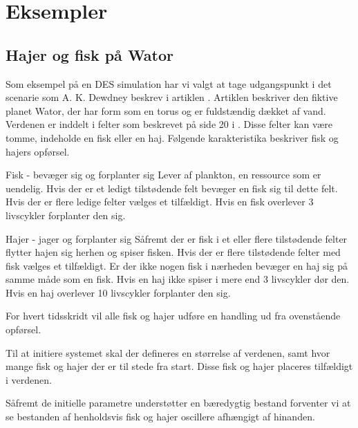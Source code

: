 \chapter{Eksempler}

\section{Hajer og fisk på Wator}
Som eksempel på en DES simulation har vi valgt at tage udgangspunkt i det scenarie som A. K. Dewdney beskrev i artiklen .
Artiklen beskriver den fiktive planet Wator, der har form som en torus og er fuldstændig dækket af vand. Verdenen er inddelt i felter som beskrevet på side 20 i . Disse felter kan være tomme, indeholde en fisk eller en haj. Følgende karakteristika beskriver fisk og hajers opførsel.


Fisk - bevæger sig og forplanter sig
Lever af plankton, en ressource som er uendelig. 
Hvis der er et ledigt tilstødende felt bevæger en fisk sig til dette felt. Hvis der er flere ledige felter vælges et tilfældigt. 
Hvis en fisk overlever 3 livscykler forplanter den sig.


Hajer - jager og forplanter sig
Såfremt der er fisk i et eller flere tilstødende felter flytter hajen sig herhen og spiser fisken. Hvis der er flere tilstødende felter med fisk vælges et tilfældigt. 
Er der ikke nogen fisk i nærheden bevæger en haj sig på samme måde som en fisk. 
Hvis en haj ikke spiser i mere end 3 livscykler dør den. 
Hvis en haj overlever 10 livscykler forplanter den sig. 

For hvert tidsskridt vil alle fisk og hajer udføre en handling ud fra ovenstående opførsel.

Til at initiere systemet skal der defineres en størrelse af verdenen, samt hvor mange fisk og hajer der er til stede fra start. Disse fisk og hajer placeres tilfældigt i verdenen. 

Såfremt de initielle parametre understøtter en bæredygtig bestand forventer vi at se bestanden af henholdsvis fisk og hajer oscillere afhængigt af hinanden.

 
